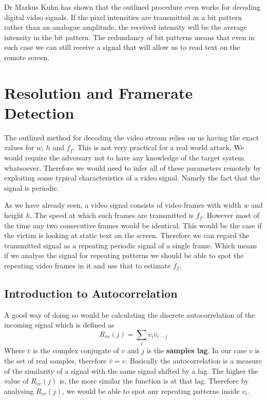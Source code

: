 \documentclass[a4paper,12pt,twoside,openright]{report}
\begin{document}
Dr Markus Kuhn has shown that the outlined procedure even works for decoding digital video signals\cite{kuhn2005electromagnetic}. If the pixel intensities are transmitted as a bit pattern rather than an analogue amplitude, the received intensity will be the average intensity in the bit pattern. The redundancy of bit patterns means that even in such case we can still receive a signal that will allow us to read text on the remote screen. 

\section{Resolution and Framerate Detection}

The outlined method for decoding the video stream relies on us having the exact values for $w$, $h$ and $f_{f}$. This is not very practical for a real world attack. We would require the adversary not to have any knowledge of the target system whatsoever. Therefore we would need to infer all of these parameters remotely by exploiting some typical characteristics of a video signal. Namely the fact that the signal is periodic.

As we have already seen, a video signal consists of video frames with width $w$ and height $h$. The speed at which such frames are transmitted is $f_{f}$. However most of the time any two consecutive frames would be identical. This would be the case if the victim is looking at static text on the screen. Therefore we can regard the transmitted signal as a repeating periodic signal of a single frame. Which means if we analyse the signal for repeating patterns we should be able to spot the repeating video frames in it and use that to estimate $f_{f}$.

\subsection{Introduction to Autocorrelation}
A good way of doing so would be calculating the discrete autocorrelation of the incoming signal which is defined as 
$$ R_{vv}(j)=\sum\limits_{i} v_{i} \bar{v}_{i-j} $$
Where $\bar{v}$ is the complex conjugate of $v$ and $j$ is the \textbf{samples lag}. In our case $v$ is the set of real samples, therefore $\bar{v} = v$. Basically the autocorrelation is a measure of the similarity of a signal with the same signal shifted by a lag. The higher the value of $R_{vv}(j)$ is, the more similar the function is at that lag. Therefore by analysing $R_{vv}(j)$, we would be able to spot any repeating patterns inside $v_{i}$.
\end{document}
